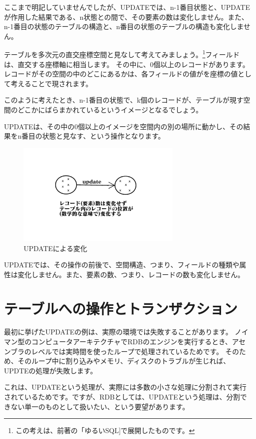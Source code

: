 ここまで明記していませんでしたが、UPDATEでは、n-1番目状態と、UPDATEが作用した結果である、n状態との間で、その要素の数は変化しません。また、n-1番目の状態のテーブルの構造と、n番目の状態のテーブルの構造も変化しません。

テーブルを多次元の直交座標空間と見なして考えてみましょう。\footnote{この考えは、前著の「ゆるいSQL]で展開したものです。}フィールドは、直交する座標軸に相当します。
その中に、0個以上のレコードがあります。レコードがその空間の中のどこにあるかは、各フィールドの値がを座標の値として考えることで現されます。

このように考えたとき、n-1番目の状態で、k個のレコードが、テーブルが現す空間のどこかにばらまかれているというイメージとなるでしょう。

UPDATEは、その中の0個以上のイメージを空間内の別の場所に動かし、その結果をn番目の状態と見なす、という操作となります。

\begin{figure}[htbp]
  \includegraphics[width=8cm,pagebox=cropbox]{draw/update2.pdf}
  \caption{UPDATEによる変化}
  \label{fig:move}
\end{figure}


UPDATEでは、その操作の前後で、空間構造、つまり、フィールドの種類や属性は変化しません。また、要素の数、つまり、レコードの数も変化しません。

\section{テーブルへの操作とトランザクション}

最初に挙げたUPDATEの例は、実際の環境では失敗することがあります。
ノイマン型のコンピュータアーキテクチャでRDBのエンジンを実行するとき、アセンブラのレベルでは実時間を使ったループで処理されているためです。
そのため、そのループ中に割り込みやメモリ、ディスクのトラブルが生じれば、UPDTEの処理が失敗します。

これは、UPDATEという処理が、実際には多数の小さな処理に分割されて実行されているためです。ですが、RDBとしては、UPDATEという処理は、分割できない単一のものとして扱いたい、という要望があります。

